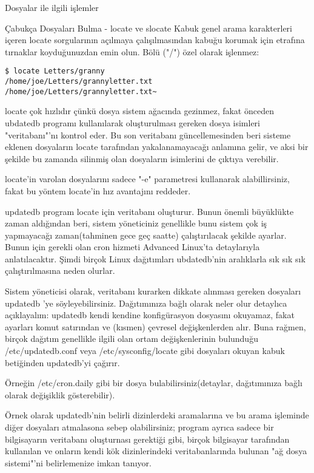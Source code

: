 \begin{section}{Dosyalar ile ilgili işlemler}
\begin{subsection}{Çabukça Dosyaları Bulma - locate ve slocate}
Kabuk genel arama karakterleri içeren locate sorgularının açılmaya çalışılmasından kabuğu korumak için etrafına tırnaklar koyduğunuzdan emin olun.
Bölü ("/") özel olarak işlenmez:
\begin{verbatim}
$ locate Letters/granny
/home/joe/Letters/grannyletter.txt
/home/joe/Letters/grannyletter.txt~
\end{verbatim}

locate çok hızlıdır çünkü dosya sistem ağacında gezinmez, fakat önceden ubdatedb programı kullanılarak oluşturulması gereken dosya isimleri "veritabanı"'nı kontrol eder. Bu son veritabanı güncellemesinden beri sisteme eklenen dosyaların locate tarafından yakalanamayacağı anlamına gelir, ve aksi bir şekilde bu zamanda silinmiş olan dosyaların isimlerini de çıktıya verebilir.

locate'in varolan dosyalarını sadece "-e" parametresi kullanarak alabillirsiniz, fakat bu yöntem locate'in hız avantajını reddeder.

updatedb program locate için veritabanı oluşturur. Bunun önemli büyüklükte zaman aldığından beri, sistem yöneticiniz genellikle bunu sistem çok iş yapmayacağı zaman(tahminen gece geç saatte) çalıştırılacak şekilde ayarlar.
Bunun için gerekli olan cron hizmeti Advanced Linux'ta detaylarıyla anlatılacaktır. Şimdi birçok Linux dağıtımları ubdatedb'nin aralıklarla sık sık sık çalıştırılmasına neden olurlar.

Sistem yöneticisi olarak, veritabanı kurarken dikkate alınması gereken dosyaları updatedb 'ye söyleyebilirsiniz. Dağıtımınıza bağlı olarak neler olur detaylıca açıklayalım: updatedb kendi kendine konfigürasyon dosyasını okuyamaz, fakat ayarları komut satırından ve (kısmen) çevresel değişkenlerden alır. Buna rağmen, birçok dağıtım genellikle ilgili olan ortam değişkenlerinin bulunduğu /etc/updatedb.conf veya /etc/sysconfig/locate gibi dosyaları okuyan kabuk betiğinden updatedb'yi çağırır.

	Örneğin /etc/cron.daily gibi bir dosya bulabilirsiniz(detaylar, dağıtımınıza bağlı olarak değişiklik gösterebilir).
	
	Örnek olarak updatedb'nin belirli dizinlerdeki aramalarına ve bu arama işleminde diğer dosyaları atmalasona sebep olabilirsiniz; program ayrıca sadece bir bilgisayarın veritabanı oluşturnası gerektiği gibi, birçok bilgisayar  tarafından kullanılan ve onların kendi kök dizinlerindeki veritabanlarında bulunan "ağ dosya sistemi"'ni belirlemenize imkan tanıyor.
	

\end{subsection}
\end{section}
